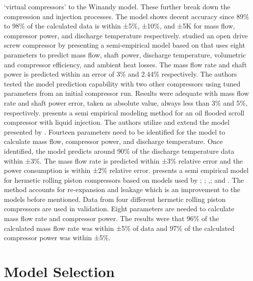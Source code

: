 \documentclass[preprint,11pt,authoryear]{elsarticle}
\begin{document}
‘virtual compressors’ to the Winandy model. These further break down the compression and injection processes. The model shows decent accuracy since 89\% to 98\% of the calculated data is within ±5\%, ±10\%, and ±5K for mass flow, compressor power, and discharge temperature respectively. \cite{Giuffrida2016} studied an open drive screw compressor by presenting a semi-empirical model based on \cite{Winandy_scr} that uses eight parameters to predict mass flow, shaft power, discharge temperature, volumetric and compressor efficiency, and ambient heat losses. The mass flow rate and shaft power is predicted within an error of 3\% and 2.44\% respectively. The authors tested the model prediction capability with two other compressors using  tuned parameters from an initial compressor run. Results were adequate with mass flow rate and shaft power error, taken as absolute value, always less than 3\% and 5\%, respectively. \cite{James2016a} presents a semi empirical modeling method for an oil flooded scroll compressor with liquid injection. The authors utilize and extend the model presented by \cite{Winandy_scr}. Fourteen parameters need to be identified for the model to calculate mass flow, compressor power, and discharge temperature. Once identified, the model predicts around 90\% of the discharge temperature data within ±3\%. The mass flow rate is predicted within ±3\% relative error and the power consumption is within ±2\% relative error. \cite{Molinaroli2017} presents a semi empirical model for hermetic rolling piston compressors based on models used by \cite{Dardenne2015}; \cite{Giuffrida2016}; \cite{Li2012},\cite{Li2012a}; and \cite{Winandy_recip}. The method accounts for re-expansion and leakage which is an improvement to the models before mentioned. Data from four different hermetic rolling piston compressors are used in validation. Eight parameters are needed to calculate mass flow rate and compressor power. The results were that 96\% of the calculated mass flow rate was within ±5\% of data and 97\% of the calculated compressor power was within ±5\%.


\section{Model Selection}
\end{document}
